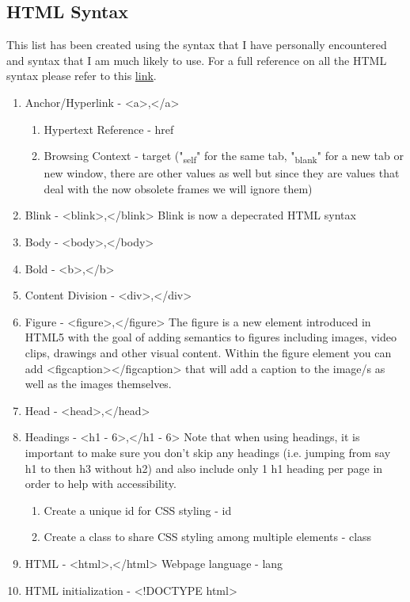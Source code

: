 \documentclass[11pt]{article}
\begin{document}
\subsection{HTML Syntax}
\label{sec:orge707038}
This list has been created using the syntax that I have personally encountered and syntax that I am
much likely to use. For a full reference on all the HTML syntax please refer to this \href{https://developer.mozilla.org/en-US/docs/Web/HTML/Reference/Global\_attributes}{link}.
\begin{enumerate}
\item Anchor/Hyperlink - <a>,</a>
\begin{enumerate}
\item Hypertext Reference - href
\item Browsing Context - target
("\textsubscript{self}" for the same tab, "\textsubscript{blank}" for a new tab or new window, there are other values as
well but since they are values that deal with the now obsolete frames we will ignore them)
\end{enumerate}
\item Blink - <blink>,</blink>
Blink is now a depecrated HTML syntax
\item Body - <body>,</body>
\item Bold - <b>,</b>
\item Content Division - <div>,</div>
\item Figure - <figure>,</figure>
The figure is a new element introduced in HTML5 with the goal of adding semantics to figures
including images, video clips, drawings and other visual content. Within the figure element you
can add <figcaption></figcaption> that will add a caption to the image/s as well as the images
themselves.
\item Head - <head>,</head>
\item Headings - <h1 - 6>,</h1 - 6>
Note that when using headings, it is important to make sure you don't skip any headings
(i.e. jumping from say h1 to then h3 without h2) and also include only 1 h1 heading per page in
order to help with accessibility.
\begin{enumerate}
\item Create a unique id for CSS styling - id
\item Create a class to share CSS styling among multiple elements - class
\end{enumerate}
\item HTML - <html>,</html>
Webpage language - lang
\item HTML initialization - <!DOCTYPE html>

\end{enumerate}
\end{document}
